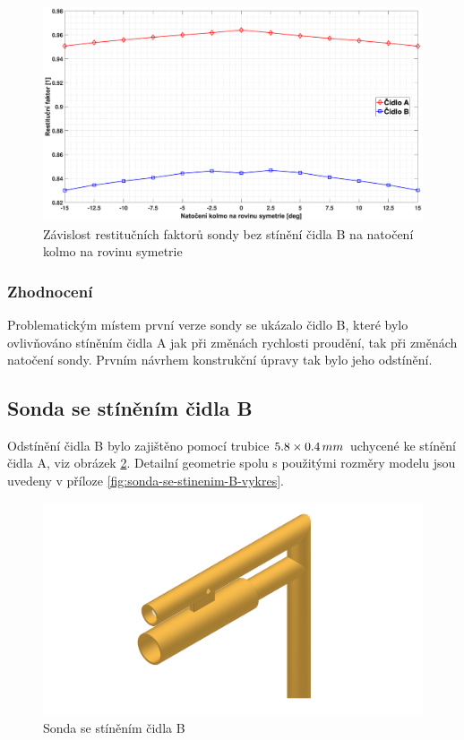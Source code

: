              \begin{figure}[ht!]
                \centering
                \includegraphics*[width=\textwidth, trim={5.9cm 1.0cm 5.8cm 2.0cm}]{400_SIMULACE_KONSTRUKCNICH_UPRAV/Grafy/01_kolma_rovina}
                \caption{Závislost restitučních faktorů sondy bez stínění čidla B na natočení kolmo na rovinu symetrie}
                \label{fig:sonda-bez-stineni-kolma-rovina}
            \end{figure}

        \subsubsection{Zhodnocení}
            Problematickým místem první verze sondy se ukázalo čidlo B, které bylo ovlivňováno stíněním čidla A jak při změnách rychlosti proudění, tak při změnách natočení sondy. Prvním návrhem konstrukční úpravy tak bylo jeho odstínění.
    
    \subsection{Sonda se stíněním čidla B}
        Odstínění čidla B bylo zajištěno pomocí trubice $5.8 \times 0.4 \, mm$ uchycené ke stínění čidla A, viz obrázek \ref{fig:sonda-se-stinenim-B}. Detailní geometrie spolu s použitými rozměry modelu jsou uvedeny v příloze \ref{fig:sonda-se-stinenim-B-vykres}. 
        
        \begin{figure}[ht!]
            \centering
            \includegraphics[width=\textwidth]{400_SIMULACE_KONSTRUKCNICH_UPRAV/Vykresy_rendery/Sonda_se_stinenim_B.png}
            \caption{Sonda se stíněním čidla B}
            \label{fig:sonda-se-stinenim-B}
        \end{figure}

